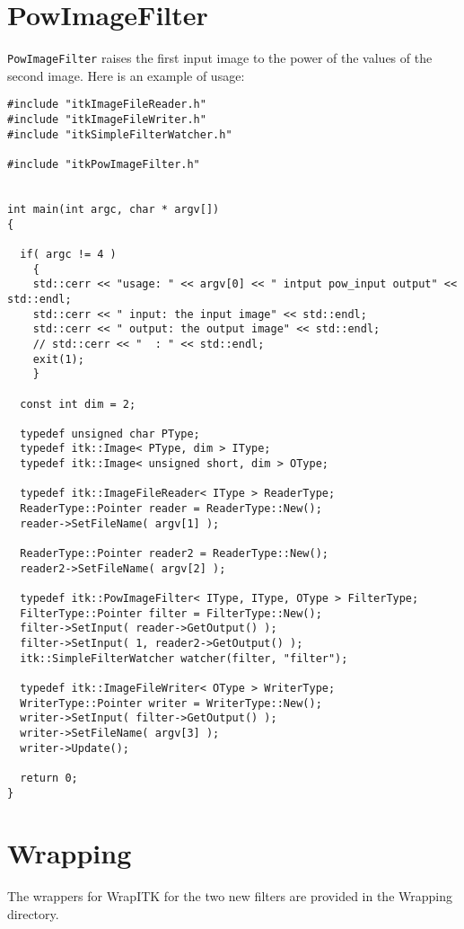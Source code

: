 \documentclass{InsightArticle}
\begin{document}
\section{PowImageFilter}
\verb$PowImageFilter$ raises the first input image to the power of the values of the second image. Here is an example of usage:
\small \begin{verbatim}
#include "itkImageFileReader.h"
#include "itkImageFileWriter.h"
#include "itkSimpleFilterWatcher.h"

#include "itkPowImageFilter.h"


int main(int argc, char * argv[])
{

  if( argc != 4 )
    {
    std::cerr << "usage: " << argv[0] << " intput pow_input output" << std::endl;
    std::cerr << " input: the input image" << std::endl;
    std::cerr << " output: the output image" << std::endl;
    // std::cerr << "  : " << std::endl;
    exit(1);
    }

  const int dim = 2;
  
  typedef unsigned char PType;
  typedef itk::Image< PType, dim > IType;
  typedef itk::Image< unsigned short, dim > OType;

  typedef itk::ImageFileReader< IType > ReaderType;
  ReaderType::Pointer reader = ReaderType::New();
  reader->SetFileName( argv[1] );

  ReaderType::Pointer reader2 = ReaderType::New();
  reader2->SetFileName( argv[2] );

  typedef itk::PowImageFilter< IType, IType, OType > FilterType;
  FilterType::Pointer filter = FilterType::New();
  filter->SetInput( reader->GetOutput() );
  filter->SetInput( 1, reader2->GetOutput() );
  itk::SimpleFilterWatcher watcher(filter, "filter");

  typedef itk::ImageFileWriter< OType > WriterType;
  WriterType::Pointer writer = WriterType::New();
  writer->SetInput( filter->GetOutput() );
  writer->SetFileName( argv[3] );
  writer->Update();

  return 0;
}
\end{verbatim} \normalsize

\section{Wrapping}

The wrappers for WrapITK for the two new filters are provided in the Wrapping directory.

\appendix





\nocite{ITKSoftwareGuide}
\end{document}
